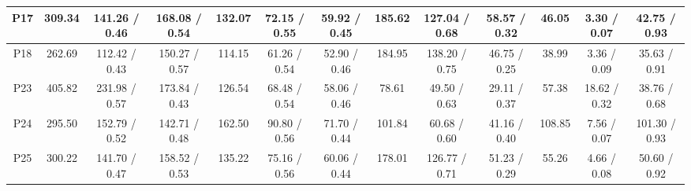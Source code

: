 \begin{tabular}{|c|c|c|c|c|c|c|c|c|c|c|c|c|}
P17& 309.34 & 141.26 /   0.46 & 168.08 /   0.54& 132.07 &  72.15 /   0.55 &  59.92 /   0.45& 185.62 & 127.04 /   0.68 &  58.57 /   0.32&  46.05 &   3.30 /   0.07 &  42.75 /   0.93\\ \hline 
P18& 262.69 & 112.42 /   0.43 & 150.27 /   0.57& 114.15 &  61.26 /   0.54 &  52.90 /   0.46& 184.95 & 138.20 /   0.75 &  46.75 /   0.25&  38.99 &   3.36 /   0.09 &  35.63 /   0.91\\ \hline 
P23& 405.82 & 231.98 /   0.57 & 173.84 /   0.43& 126.54 &  68.48 /   0.54 &  58.06 /   0.46&  78.61 &  49.50 /   0.63 &  29.11 /   0.37&  57.38 &  18.62 /   0.32 &  38.76 /   0.68\\ \hline 
P24& 295.50 & 152.79 /   0.52 & 142.71 /   0.48& 162.50 &  90.80 /   0.56 &  71.70 /   0.44& 101.84 &  60.68 /   0.60 &  41.16 /   0.40& 108.85 &   7.56 /   0.07 & 101.30 /   0.93\\ \hline 
P25& 300.22 & 141.70 /   0.47 & 158.52 /   0.53& 135.22 &  75.16 /   0.56 &  60.06 /   0.44& 178.01 & 126.77 /   0.71 &  51.23 /   0.29&  55.26 &   4.66 /   0.08 &  50.60 /   0.92\\ \hline 
\end{tabular}